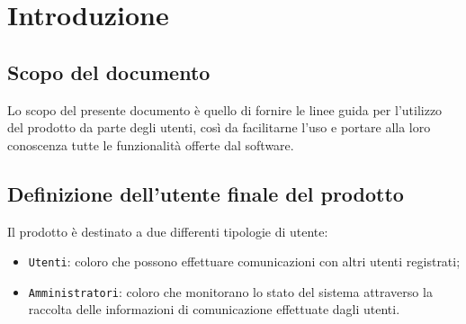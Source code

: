 \section{Introduzione}{

	\subsection{Scopo del documento}{
Lo scopo del presente documento è quello di fornire le linee guida per l’utilizzo del prodotto \textbf{\mytalk} da parte degli utenti, così da facilitarne l'uso e portare alla loro conoscenza tutte le funzionalità offerte dal software.
	}



\subsection{Definizione dell'utente finale del prodotto}{
Il prodotto è destinato a due differenti tipologie di utente:
\begin{itemize}
	\item[] \texttt{Utenti}: coloro che possono effettuare comunicazioni con altri utenti registrati;
	\item[] \texttt{Amministratori}: coloro che monitorano lo stato del sistema attraverso la raccolta delle informazioni di comunicazione effettuate dagli utenti.
\end{itemize}
	}

}
